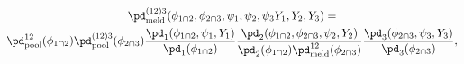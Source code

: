 \begin{multline}
  \pd_{\text{meld}}^{(12)3}(\phi_{1 \cap 2}, \phi_{2 \cap 3}, \psi_{1}, \psi_{2}, \psi_{3} Y_{1}, Y_{2}, Y_{3}) = \\
    \pd_{\text{pool}}^{12}(\phi_{1 \cap 2})
    \pd_{\text{pool}}^{(12)3}(\phi_{2 \cap 3}) 
    \frac{
      \pd_{1}(\phi_{1 \cap 2}, \psi_{1}, Y_{1})
    } {
      \pd_{1}(\phi_{1 \cap 2})
    }
    \frac {
      \pd_{2}(\phi_{1 \cap 2}, \phi_{2 \cap 3}, \psi_{2}, Y_{2})
    } {
      \pd_{2}(\phi_{1 \cap 2})
      \pd_{\text{meld}}^{12}(\phi_{2 \cap 3})
    }
    \frac{
      \pd_{3}(\phi_{2 \cap 3}, \psi_{3}, Y_{3})
    } {
      \pd_{3}(\phi_{2 \cap 3})
    },
  \label{eqn:expanded-double-melded-model}
\end{multline}